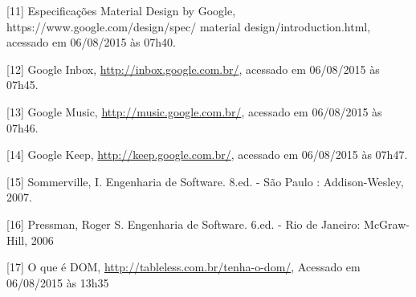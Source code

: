 \documentclass[
  12pt,				%
  openany,
  oneside,
  a4paper,			%
  english,			%
  brazil
]{article}
\numberwithin{figure}{section}
\numberwithin{table}{section}
\begin{document}
[11] Especificações Material Design by Google, https://www.google.com/design/spec/ material design/introduction.html, acessado em 06/08/2015 às 07h40.

[12] Google Inbox, \url{http://inbox.google.com.br/}, acessado em 06/08/2015 às 07h45.

[13] Google Music, \url{http://music.google.com.br/}, acessado em 06/08/2015 às 07h46.

[14] Google Keep, \url{http://keep.google.com.br/}, acessado em 06/08/2015 às 07h47.

[15] Sommerville, I. Engenharia de Software. 8.ed. - São Paulo : Addison-Wesley, 2007.

[16] Pressman, Roger S. Engenharia de Software. 6.ed. - Rio de Janeiro: McGraw-Hill, 2006

[17] O que é DOM, \url{http://tableless.com.br/tenha-o-dom/}, Acessado em 06/08/2015 às 13h35
\end{document}

